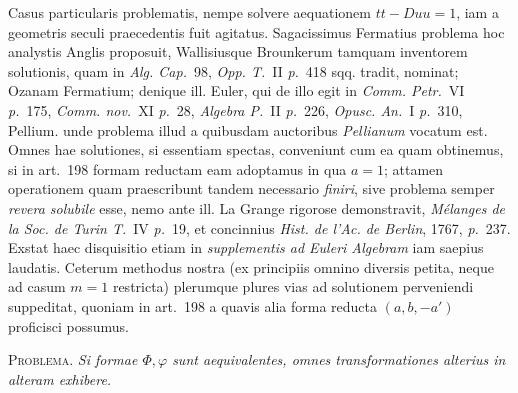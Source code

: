 Casus particularis problematis, nempe solvere aequationem \(tt-Duu=1\), iam a geometris seculi praecedentis fuit agitatus. Sagacissimus Fermatius problema hoc analystis Anglis proposuit, Wallisiusque Brounkerum tamquam inventorem solutionis, quam in \textit{Alg. Cap.}~98, \textit{Opp. T.}~II \textit{p.}~418 sqq. tradit, nominat; Ozanam Fermatium; denique ill. Euler, qui de illo egit in \textit{Comm. Petr.}~VI \textit{p.}~175, \textit{Comm. nov.}~XI \textit{p.}~28, \textit{Algebra P.}~II \textit{p.}~226, \textit{Opusc. An.}~I \textit{p.}~310, Pellium. unde
problema illud a quibusdam auctoribus \textit{Pellianum} vocatum est. Omnes hae solutiones, si essentiam spectas, conveniunt cum ea quam obtinemus, si in art.~198 formam reductam eam adoptamus in qua \(a=1\); attamen operationem quam praescribunt tandem necessario \textit{finiri}, sive problema semper \textit{revera solubile} esse, nemo ante ill. La Grange rigorose demonstravit, \textit{Mélanges de la Soc. de Turin T.}~IV \textit{p.}~19, et concinnius \textit{Hist. de l'Ac. de Berlin}, 1767, \textit{p.}~237. Exstat haec disquisitio etiam in \textit{supplementis ad Euleri Algebram} iam saepius laudatis. Ceterum methodus nostra (ex principiis omnino diversis petita, neque ad casum \(m=1\) restricta) plerumque plures vias ad solutionem perveniendi suppeditat, quoniam in art.~198 a quavis alia forma reducta \((a,b,-a')\) proficisci possumus.

\textsc{Problema.} \textit{Si formae \(\Phi,\varphi\) sunt aequivalentes, omnes transformationes alterius in alteram exhibere.}


